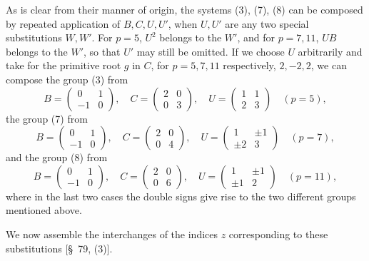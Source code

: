 \documentclass[11pt]{article}
\begin{document}
As is clear from their manner of origin, the systems (3), (7), (8) can be composed by repeated application of $B,C,U,U'$, when $U,U'$ are any two special substitutions $W,W'$. For $p=5$, $U^2$ belongs to the $W'$, and for $p=7,11$, $UB$ belongs to the $W'$, so that $U'$ may still be omitted. If we choose $U$ arbitrarily and take for the primitive root $g$ in $C$, for $p=5,7,11$ respectively, $2,-2,2$, we can compose the group (3) from
\[
 B=\begin{pmatrix}0&1\\-1&0\end{pmatrix},\quad
 C=\begin{pmatrix}2&0\\0&3\end{pmatrix},\quad
 U=\begin{pmatrix}1&1\\2&3\end{pmatrix}\quad(p=5),
\]
the group (7) from
\[
 B=\begin{pmatrix}0&1\\-1&0\end{pmatrix},\quad
 C=\begin{pmatrix}2&0\\0&4\end{pmatrix},\quad
 U=\begin{pmatrix}1&\pm1\\ \pm2&3\end{pmatrix}\quad(p=7),
\]
and the group (8) from
\[
 B=\begin{pmatrix}0&1\\-1&0\end{pmatrix},\quad
 C=\begin{pmatrix}2&0\\0&6\end{pmatrix},\quad
 U=\begin{pmatrix}1&\pm1\\ \pm1&2\end{pmatrix}\quad(p=11),
\]
where in the last two cases the double signs give rise to the two different groups mentioned above.

We now assemble the interchanges of the indices $z$ corresponding to these substitutions [\S~79, (3)].
\end{document}
